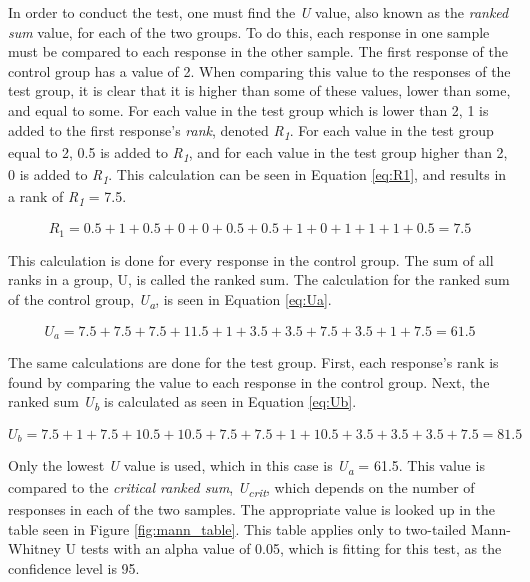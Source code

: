 In order to conduct the test, one must find the \textit{U} value, also known as the \textit{ranked sum} value, for each of the two groups. To do this, each response in one sample must be compared to each response in the other sample. The first response of the control group has a value of 2. When comparing this value to the responses of the test group, it is clear that it is higher than some of these values, lower than some, and equal to some. For each value in the test group which is lower than 2, 1 is added to the first response's \textit{rank}, denoted \textit{R\textsubscript{1}}. For each value in the test group equal to 2, 0.5 is added to \textit{R\textsubscript{1}}, and for each value in the test group higher than 2, 0 is added to \textit{R\textsubscript{1}}. This calculation can be seen in Equation \ref{eq:R1}, and results in a rank of \textit{R\textsubscript{1}} = 7.5.

\begin{equation}
\label{eq:R1}
R_1 = 0.5 + 1 + 0.5 + 0 + 0 + 0.5 + 0.5 + 1 + 0 + 1 + 1 + 1 + 0.5 = 7.5
\end{equation}

This calculation is done for every response in the control group. The sum of all ranks in a group, U, is called the ranked sum. The calculation for the ranked sum of the control group, \textit{U\textsubscript{a}}, is seen in Equation \ref{eq:Ua}.

\begin{equation}
\label{eq:Ua}
U_a = 7.5 + 7.5 + 7.5 + 11.5 + 1 + 3.5 + 3.5 + 7.5 + 3.5 + 1 + 7.5 = 61.5
\end{equation}

The same calculations are done for the test group. First, each response's rank is found by comparing the value to each response in the control group. Next, the ranked sum \textit{U\textsubscript{b}} is calculated as seen in Equation \ref{eq:Ub}.

\begin{equation}
\label{eq:Ub}
U_b = 7.5 + 1 + 7.5 + 10.5 + 10.5 + 7.5 + 7.5 + 1 + 10.5 + 3.5 + 3.5 + 3.5 + 7.5 = 81.5
\end{equation}

Only the lowest \textit{U} value is used, which in this case is \textit{U\textsubscript{a}} = 61.5. This value is compared to the \textit{critical ranked sum}, \textit{U\textsubscript{crit}}, which depends on the number of responses in each of the two samples. The appropriate value is looked up in the table seen in Figure \ref{fig:mann_table}. This table applies only to two-tailed Mann-Whitney U tests with an alpha value of 0.05, which is fitting for this test, as the confidence level is 95.

